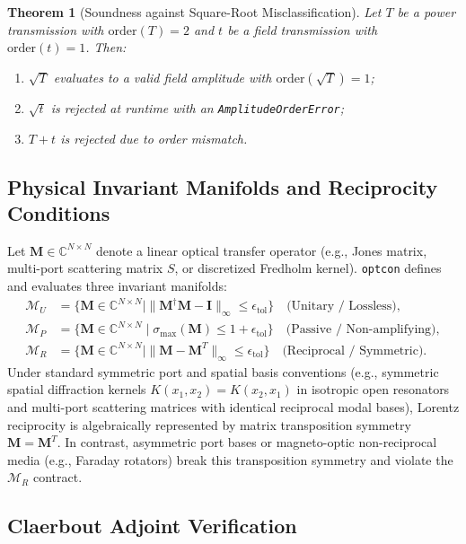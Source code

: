 \documentclass[preprint,12pt]{elsarticle}
\newtheorem{theorem}{Theorem}
\begin{document}
\begin{theorem}[Soundness against Square-Root Misclassification]
Let $T$ be a power transmission with $\mathrm{order}(T) = 2$ and $t$ be a field transmission with $\mathrm{order}(t) = 1$. Then:
\begin{enumerate}
    \item $\sqrt{T}$ evaluates to a valid field amplitude with $\mathrm{order}(\sqrt{T}) = 1$;
    \item $\sqrt{t}$ is rejected at runtime with an \texttt{AmplitudeOrderError};
    \item $T + t$ is rejected due to order mismatch.
\end{enumerate}
\end{theorem}

\subsection{Physical Invariant Manifolds and Reciprocity Conditions}

Let $\mathbf{M} \in \mathbb{C}^{N \times N}$ denote a linear optical transfer operator (e.g., Jones matrix, multi-port scattering matrix $S$, or discretized Fredholm kernel). \texttt{optcon} defines and evaluates three invariant manifolds:
\begin{align}
\mathcal{M}_U &= \{ \mathbf{M} \in \mathbb{C}^{N \times N} \mid \|\mathbf{M}^\dagger \mathbf{M} - \mathbf{I}\|_\infty \le \epsilon_{\mathrm{tol}} \} \quad \text{(Unitary / Lossless)}, \\
\mathcal{M}_P &= \{ \mathbf{M} \in \mathbb{C}^{N \times N} \mid \sigma_{\max}(\mathbf{M}) \le 1 + \epsilon_{\mathrm{tol}} \} \quad \text{(Passive / Non-amplifying)}, \\
\mathcal{M}_R &= \{ \mathbf{M} \in \mathbb{C}^{N \times N} \mid \|\mathbf{M} - \mathbf{M}^T\|_\infty \le \epsilon_{\mathrm{tol}} \} \quad \text{(Reciprocal / Symmetric)}.
\end{align}
Under standard symmetric port and spatial basis conventions (e.g., symmetric spatial diffraction kernels $K(x_1, x_2) = K(x_2, x_1)$ in isotropic open resonators and multi-port scattering matrices with identical reciprocal modal bases), Lorentz reciprocity is algebraically represented by matrix transposition symmetry $\mathbf{M} = \mathbf{M}^T$. In contrast, asymmetric port bases or magneto-optic non-reciprocal media (e.g., Faraday rotators) break this transposition symmetry and violate the $\mathcal{M}_R$ contract.

\subsection{Claerbout Adjoint Verification}
\end{document}
